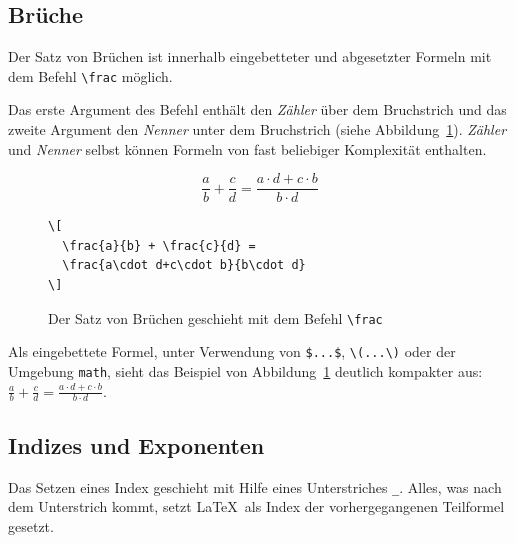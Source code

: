 \documentclass[a4paper,10pt,twoside]{scrbook}
\begin{document}
{\subsection{Brüche}

Der Satz von Brüchen ist innerhalb eingebetteter und abgesetzter Formeln mit dem Befehl \verb!\frac! möglich. 



Das erste Argument des Befehl enthält den \textsl{Zähler} über dem Bruchstrich und das zweite Argument den \textsl{Nenner} unter dem Bruchstrich (siehe Abbildung~\ref{Beispiel_frac1}). \textsl{Zähler} und
\textsl{Nenner} selbst können Formeln von fast beliebiger Komplexität enthalten.

\begin{figure}[H]
\begin{minipage}[c]{.4\textwidth}
\setlength{\parskip}{1em}
\[
  \frac{a}{b} + \frac{c}{d} = 
  \frac{a\cdot d+c\cdot b}{b\cdot d}
\]
\end{minipage}
\hfill
\begin{minipage}{.58\textwidth}
\setlength{\parskip}{1em}
\begin{lstlisting}[label=fracbeispiel, style=customlatex]
\[
  \frac{a}{b} + \frac{c}{d} = 
  \frac{a\cdot d+c\cdot b}{b\cdot d}
\]
\end{lstlisting}
\end{minipage}
\caption{Der Satz von Brüchen geschieht mit dem Befehl \texttt{\textbackslash frac}}
\label{Beispiel_frac1}
\end{figure}

Als eingebettete Formel, unter Verwendung von \verb!$...$!, \verb!\(...\)! oder der Umgebung \verb!math!,  sieht das Beispiel von Abbildung~\ref{Beispiel_frac1} deutlich kompakter aus: \(\frac{a}{b} + \frac{c}{d} = \frac{a\cdot d+c\cdot b}{b\cdot d}\).

\subsection{Indizes und Exponenten}

Das Setzen eines Index geschieht 
mit Hilfe eines Unterstriches 
\verb!_!. Alles, was nach
dem Unterstrich kommt, setzt \LaTeX\ als Index 
der vorhergegangenen Teilformel gesetzt. 

}
\end{document}
